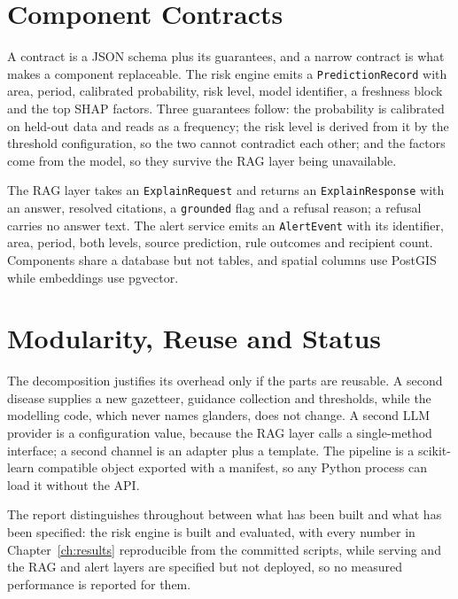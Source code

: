 \documentclass[10pt,openany]{report}
\begin{document}
\section{Component Contracts}

A contract is a JSON schema plus its guarantees, and a narrow contract is what makes a component
replaceable. The risk engine emits a \texttt{PredictionRecord} with area, period, calibrated
probability, risk level, model identifier, a freshness block and the top SHAP factors. Three
guarantees follow: the probability is calibrated on held-out data and reads as a frequency; the risk
level is derived from it by the threshold configuration, so the two cannot contradict each other; and
the factors come from the model, so they survive the RAG layer being unavailable.

The RAG layer takes an \texttt{ExplainRequest} and returns an \texttt{ExplainResponse} with an answer,
resolved citations, a \texttt{grounded} flag and a refusal reason; a refusal carries no answer text.
The alert service emits an \texttt{AlertEvent} with its identifier, area, period, both levels, source
prediction, rule outcomes and recipient count. Components share a database but not tables, and spatial
columns use PostGIS while embeddings use pgvector.

\section{Modularity, Reuse and Status}

The decomposition justifies its overhead only if the parts are reusable. A second disease supplies a
new gazetteer, guidance collection and thresholds, while the modelling code, which never names
glanders, does not change. A second LLM provider is a configuration value, because the RAG layer calls
a single-method interface; a second channel is an adapter plus a template. The pipeline is a
scikit-learn compatible object \cite{pedregosa2011} exported with a manifest, so any Python process
can load it without the API.

The report distinguishes throughout between what has been built and what has been specified: the risk
engine is built and evaluated, with every number in Chapter~\ref{ch:results} reproducible from the
committed scripts, while serving and the RAG and alert layers are specified but not deployed, so no
measured performance is reported for them.

\end{document}
